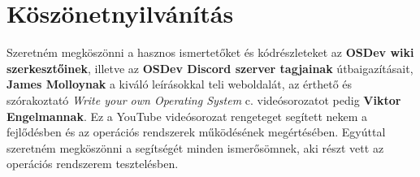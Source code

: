 \documentclass[12pt,numbers=noenddot]{report}
\begin{document}

\chapter*{Köszönetnyilvánítás}

Szeretném megköszönni a hasznos ismertetőket és kódrészleteket az
\textbf{OSDev wiki szerkesztőinek}, illetve az \textbf{OSDev Discord
szerver tagjainak} útbaigazításait, \textbf{James Molloynak} a kiváló
leírásokkal teli weboldalát, az érthető és szórakoztató
\textit{Write your own Operating System} c. videósorozatot pedig
\textbf{Viktor Engelmannak}. Ez a YouTube videósorozat rengeteget segített nekem
a fejlődésben és az operációs rendszerek működésének megértésében. Egyúttal
szeretném megköszönni a segítségét minden ismerősömnek, aki részt vett az
operációs rendszerem tesztelésben.
\end{document}
